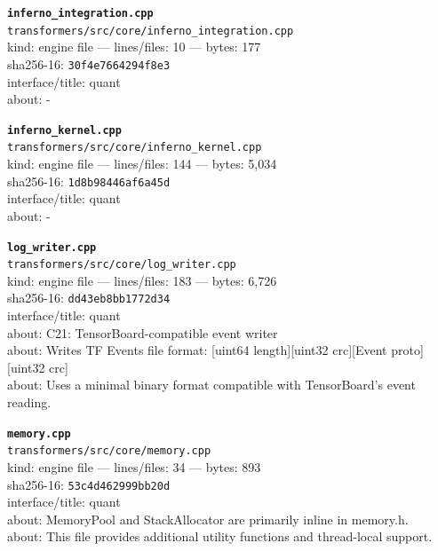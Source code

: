 \noindent\textbf{\texttt{inferno\_integration.cpp}}\\
\texttt{transformers/src/core/inferno\_integration.cpp}\\
kind: engine file --- lines/files: 10 --- bytes: 177\\
sha256-16: \texttt{30f4e7664294f8e3}\\
interface/title: quant\\
about: -\\
\vspace*{6.0pt}

\noindent\textbf{\texttt{inferno\_kernel.cpp}}\\
\texttt{transformers/src/core/inferno\_kernel.cpp}\\
kind: engine file --- lines/files: 144 --- bytes: 5,034\\
sha256-16: \texttt{1d8b98446af6a45d}\\
interface/title: quant\\
about: -\\
\vspace*{6.0pt}

\noindent\textbf{\texttt{log\_writer.cpp}}\\
\texttt{transformers/src/core/log\_writer.cpp}\\
kind: engine file --- lines/files: 183 --- bytes: 6,726\\
sha256-16: \texttt{dd43eb8bb1772d34}\\
interface/title: quant\\
about: C21: TensorBoard-compatible event writer\\
about: Writes TF Events file format: [uint64 length][uint32 crc][Event proto][uint32 crc]\\
about: Uses a minimal binary format compatible with TensorBoard's event reading.\\
\vspace*{6.0pt}
\newpage

\noindent\textbf{\texttt{memory.cpp}}\\
\texttt{transformers/src/core/memory.cpp}\\
kind: engine file --- lines/files: 34 --- bytes: 893\\
sha256-16: \texttt{53c4d462999bb20d}\\
interface/title: quant\\
about: MemoryPool and StackAllocator are primarily inline in memory.h.\\
about: This file provides additional utility functions and thread-local support.\\
\vspace*{6.0pt}

